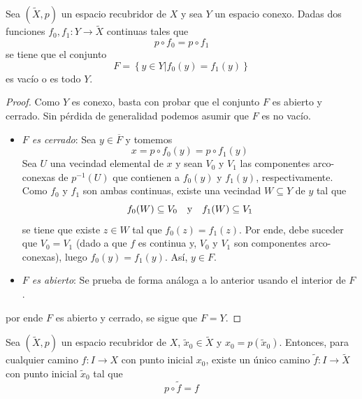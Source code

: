 \documentclass[12pt]{report}
\theoremstyle{largebreak}
\newcommand\cf[3]{\ensuremath{#1:#2\rightarrow#3}}
\begin{document}
    \begin{lema}
        Sea $(\widetilde{X},p)$ un espacio recubridor de $X$ y sea $Y$ un espacio conexo. Dadas dos funciones $\cf{f_0,f_1}{Y}{\widetilde{X}}$ continuas tales que
        \begin{equation*}
            p\circ f_0=p\circ f_1
        \end{equation*}
        se tiene que el conjunto
        \begin{equation*}
            F=\left\{y\in Y\Big|f_0(y)=f_1(y) \right\}
        \end{equation*}
        es vacío o es todo $Y$.
    \end{lema}

    \begin{proof}
        Como $Y$ es conexo, basta con probar que el conjunto $F$ es abierto y cerrado. Sin pérdida de generalidad podemos asumir que $F$ es no vacío.
        \begin{itemize}
            \item \textit{$F$ es cerrado}: Sea $y\in\overline{F}$ y tomemos
            \begin{equation*}
                x=p\circ f_0(y)=p\circ f_1(y)
            \end{equation*}
            Sea $U$ una vecindad elemental de $x$ y sean $V_0$ y $V_1$ las componentes arco-conexas de $p^{-1}(U)$ que contienen a $f_0(y)$ y $f_1(y)$, respectivamente. Como $f_0$ y $f_1$ son ambas continuas, existe una vecindad $W\subseteq Y$ de $y$ tal que
            \begin{equation*}
                f_0(W)\subseteq V_0\quad\textup{y}\quad f_1(W)\subseteq V_1
            \end{equation*}
            se tiene que existe $z\in W$ tal que $f_0(z)=f_1(z)$. Por ende, debe suceder que $V_0=V_1$ (dado a que $f$ es continua y, $V_0$ y $V_1$ son componentes arco-conexas), luego $f_0(y)=f_1(y)$. Así, $y\in F$.
            \item \textit{$F$ es abierto}: Se prueba de forma análoga a lo anterior usando el interior de $F$.
        \end{itemize}
        por ende $F$ es abierto y cerrado, se sigue que $F=Y$.
    \end{proof}

    \begin{lema}
        \label{lemaF1}
        Sea $(\widetilde{X},p)$ un espacio recubridor de $X$, $\widetilde{x}_0\in\widetilde{X}$ y $x_0=p(\widetilde{x}_0)$. Entonces, para cualquier camino $\cf{f}{I}{X}$ con punto inicial $x_0$, existe un único camino $\cf{\widetilde{f}}{I}{\widetilde{X}}$ con punto inicial $\widetilde{x}_0$ tal que
        \begin{equation*}
            p\circ \widetilde{f} =f
        \end{equation*}
    \end{lema}
\end{document}

